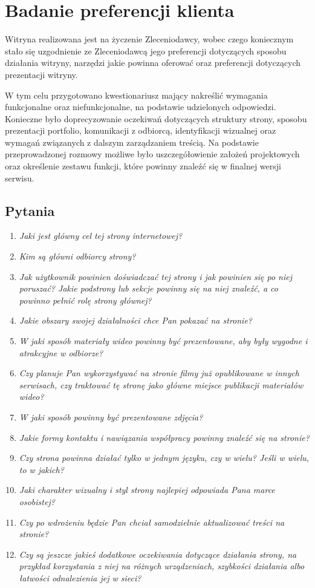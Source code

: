 \chapter{Badanie preferencji klienta}
Witryna realizowana jest na życzenie Zleceniodawcy, wobec czego koniecznym stało się uzgodnienie ze Zleceniodawcą jego preferencji dotyczących sposobu
działania witryny, narzędzi jakie powinna oferować oraz preferencji dotyczących prezentacji witryny.

W tym celu przygotowano kwestionariusz mający nakreślić wymagania funkcjonalne oraz niefunkcjonalne, na podstawie udzielonych odpowiedzi.
Konieczne było doprecyzowanie oczekiwań dotyczących struktury strony, sposobu prezentacji portfolio, komunikacji z odbiorcą, identyfikacji wizualnej oraz wymagań związanych z dalszym zarządzaniem treścią. Na podstawie przeprowadzonej rozmowy możliwe było uszczegółowienie założeń projektowych oraz określenie zestawu funkcji, które powinny znaleźć się w finalnej wersji serwisu.

\section{Pytania}
\begin{enumerate}
    \item \textit{Jaki jest główny cel tej strony internetowej?}
    \item \textit{Kim są główni odbiorcy strony?}
    \item \textit{Jak użytkownik powinien doświadczać tej strony i jak powinien się po niej poruszać? Jakie podstrony lub sekcje powinny się na niej znaleźć, a co powinno pełnić rolę strony głównej?}
    \item \textit{Jakie obszary swojej działalności chce Pan pokazać na stronie?}
    \item \textit{W jaki sposób materiały wideo powinny być prezentowane, aby były wygodne i atrakcyjne w odbiorze?}
    \item \textit{Czy planuje Pan wykorzystywać na stronie filmy już opublikowane w innych serwisach, czy traktować tę stronę jako główne miejsce publikacji materiałów wideo?}
    \item \textit{W jaki sposób powinny być prezentowane zdjęcia?}
    \item \textit{Jakie formy kontaktu i nawiązania współpracy powinny znaleźć się na stronie?}
    \item \textit{Czy strona powinna działać tylko w jednym języku, czy w wielu? Jeśli w wielu, to w jakich?}
    \item \textit{Jaki charakter wizualny i styl strony najlepiej odpowiada Pana marce osobistej?}
    \item \textit{Czy po wdrożeniu będzie Pan chciał samodzielnie aktualizować treści na stronie?}
    \item \textit{Czy są jeszcze jakieś dodatkowe oczekiwania dotyczące działania strony, na przykład korzystania z niej na różnych urządzeniach, szybkości działania albo łatwości odnalezienia jej w sieci?}
\end{enumerate}

